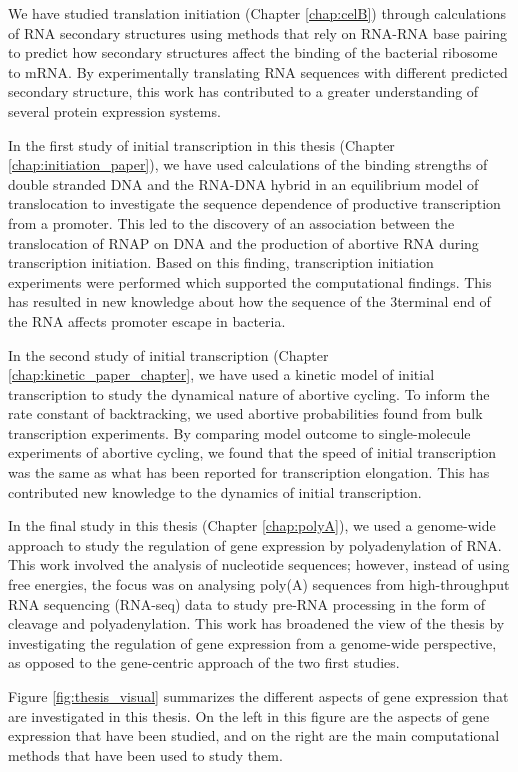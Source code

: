 We have studied translation initiation (Chapter \ref{chap:celB}) through
calculations of RNA secondary structures using methods that rely on RNA-RNA
base pairing to predict how secondary structures affect the binding of the
bacterial ribosome to mRNA. By experimentally translating RNA sequences with
different predicted secondary structure, this work has contributed to a greater
understanding of several protein expression systems.

In the first study of initial transcription in this thesis (Chapter
\ref{chap:initiation_paper}), we have used calculations of the binding
strengths of double stranded DNA and the RNA-DNA hybrid in an equilibrium
model of translocation to investigate the sequence dependence of productive
transcription from a promoter. This led to the discovery of an association
between the translocation of RNAP on DNA and the production of abortive RNA
during transcription initiation. Based on this finding, transcription
initiation experiments were performed which supported the computational
findings. This has resulted in new knowledge about how the sequence of the
3\ppp terminal end of the RNA affects promoter escape in bacteria.

In the second study of initial transcription (Chapter 
\ref{chap:kinetic_paper_chapter}, we have used a kinetic model of initial
transcription to study the dynamical nature of abortive cycling. To inform the
rate constant of backtracking, we used abortive probabilities found from bulk
transcription experiments. By comparing model outcome to single-molecule
experiments of abortive cycling, we found that the speed of initial
transcription was the same as what has been reported for transcription
elongation. This has contributed new knowledge to the dynamics of initial
transcription.

In the final study in this thesis (Chapter \ref{chap:polyA}), we used a
genome-wide approach to study the regulation of gene expression by
polyadenylation of RNA. This work involved the analysis of nucleotide
sequences; however, instead of using free energies, the focus was on analysing
poly(A) sequences from high-throughput RNA sequencing (RNA-seq) data to study
pre-RNA processing in the form of cleavage and polyadenylation. This work has
broadened the view of the thesis by investigating the regulation of gene
expression from a genome-wide perspective, as opposed to the gene-centric
approach of the two first studies.

Figure \ref{fig:thesis_visual} summarizes the different aspects of gene
expression that are investigated in this thesis. On the left in this figure are
the aspects of gene expression that have been studied, and on the right are the
main computational methods that have been used to study them.

